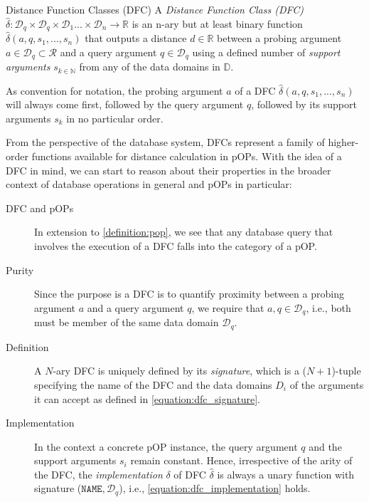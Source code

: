 \begin{definition}[label=definition:dfc]{Distance Function Classes (DFC)}{}
    A \emph{Distance Function Class (DFC)} $\hat{\delta} \colon \mathcal{D}_q \times \mathcal{D}_q \times \mathcal{D}_{1} ... \times \mathcal{D}_{n} \to \mathbb{R}$ is an n-ary but at least binary function $\hat{\delta}(a,q,s_1,...,s_n)$ that outputs a distance $d \in \mathbb{R}$ between a probing argument $a \in \mathcal{D}_q \subset \mathcal{R}$ and a query argument $q \in \mathcal{D}_q$ using a defined number of \emph{support arguments} $s_{k \in \mathbb{N}}$ from any of the data domains in $\mathbb{D}$.
\end{definition}

As convention for notation, the probing argument $a$ of a DFC $\hat{\delta}(a,q,s_1,...,s_n)$ will always come first, followed by the query argument $q$, followed by its support arguments $s_k$ in no particular order. 

From the perspective of the database system, DFCs represent a family of higher-order functions available for distance calculation in pOPs. With the idea of a DFC in mind, we can start to reason about their properties in the broader context of database operations in general and pOPs in particular:

\begin{description}

    \item[DFC and pOPs] In extension to \cref{definition:pop}, we see that any database query that involves the execution of a DFC falls into the category of a pOP.

    \item[Purity] Since the purpose is a DFC is to quantify proximity between a probing argument $a$ and a query argument $q$, we require that $a, q \in \mathcal{D}_q$, i.e., both must be member of the same data domain $\mathcal{D}_q$.

    \item[Definition] A $N$-ary DFC is uniquely defined by its \emph{signature}, which is a ($N+1$)-tuple specifying the name of the DFC and the data domains $D_i$ of the arguments it can accept as defined in \cref{equation:dfc_signature}. 

    \item[Implementation] In the context a concrete pOP instance, the query argument $q$ and the support arguments $s_i$ remain constant. Hence, irrespective of the arity of the DFC, the \emph{implementation} $\delta$ of DFC $\hat{\delta}$ is always a unary function with signature ($\mathtt{NAME}, \mathcal{D}_q$), i.e., \cref{equation:dfc_implementation} holds.
\end{description}

